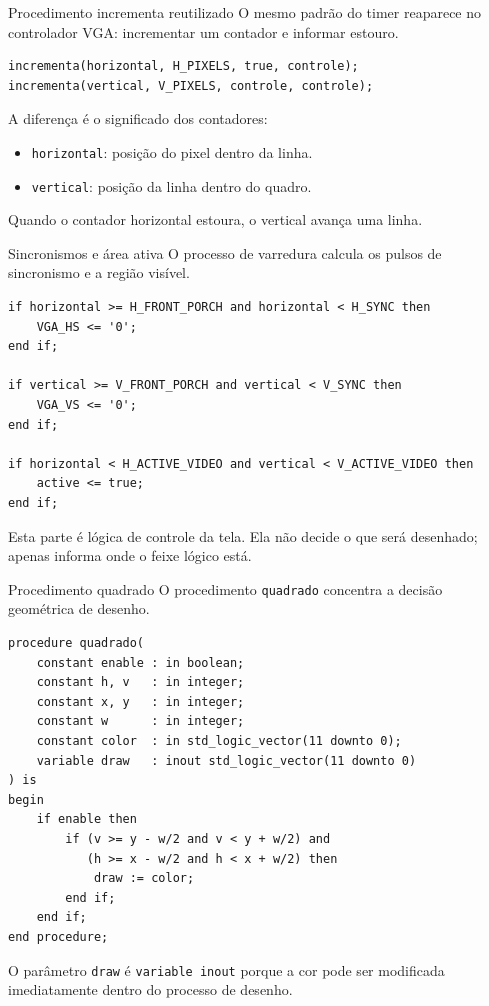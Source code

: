 \documentclass[aspectratio=169,11pt]{beamer}
\begin{document}
\begin{frame}[fragile]{Procedimento incrementa reutilizado}
    O mesmo padrão do timer reaparece no controlador VGA: incrementar um contador e informar estouro.

\begin{lstlisting}
incrementa(horizontal, H_PIXELS, true, controle);
incrementa(vertical, V_PIXELS, controle, controle);
\end{lstlisting}

    \vspace{0.5em}
    A diferença é o significado dos contadores:
    \begin{itemize}
        \item \texttt{horizontal}: posição do pixel dentro da linha.
        \item \texttt{vertical}: posição da linha dentro do quadro.
    \end{itemize}

    \vspace{0.4em}
    Quando o contador horizontal estoura, o vertical avança uma linha.
\end{frame}

\begin{frame}[fragile]{Sincronismos e área ativa}
    O processo de varredura calcula os pulsos de sincronismo e a região visível.

\begin{lstlisting}
if horizontal >= H_FRONT_PORCH and horizontal < H_SYNC then
    VGA_HS <= '0';
end if;

if vertical >= V_FRONT_PORCH and vertical < V_SYNC then
    VGA_VS <= '0';
end if;

if horizontal < H_ACTIVE_VIDEO and vertical < V_ACTIVE_VIDEO then
    active <= true;
end if;
\end{lstlisting}

    \vspace{0.4em}
    Esta parte é lógica de controle da tela. Ela não decide o que será desenhado; apenas informa onde o feixe lógico está.
\end{frame}

\begin{frame}[fragile]{Procedimento quadrado}
    O procedimento \texttt{quadrado} concentra a decisão geométrica de desenho.

\begin{lstlisting}
procedure quadrado(
    constant enable : in boolean;
    constant h, v   : in integer;
    constant x, y   : in integer;
    constant w      : in integer;
    constant color  : in std_logic_vector(11 downto 0);
    variable draw   : inout std_logic_vector(11 downto 0)
) is
begin
    if enable then
        if (v >= y - w/2 and v < y + w/2) and
           (h >= x - w/2 and h < x + w/2) then
            draw := color;
        end if;
    end if;
end procedure;
\end{lstlisting}

    \vspace{0.2em}
    O parâmetro \texttt{draw} é \texttt{variable inout} porque a cor pode ser modificada imediatamente dentro do processo de desenho.
\end{frame}
\end{document}
